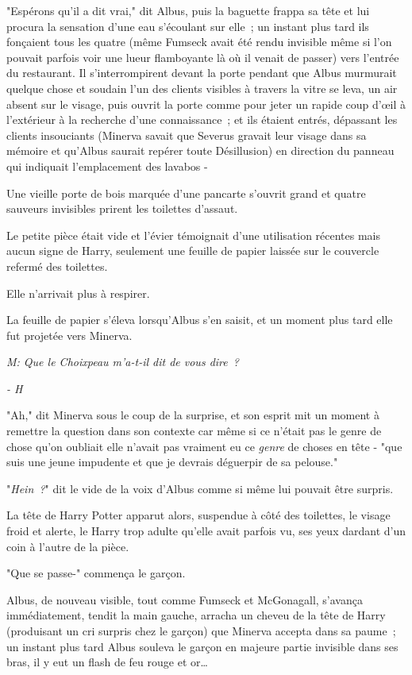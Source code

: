 "Espérons qu'il a dit vrai," dit Albus, puis la baguette frappa sa tête et lui procura la sensation d'une eau s'écoulant sur elle~; un instant plus tard ils fonçaient tous les quatre (même Fumseck avait été rendu invisible même si l'on pouvait parfois voir une lueur flamboyante là où il venait de passer) vers l'entrée du restaurant. Il s'interrompirent devant la porte pendant que Albus murmurait quelque chose et soudain l'un des clients visibles à travers la vitre se leva, un air absent sur le visage, puis ouvrit la porte comme pour jeter un rapide coup d'œil à l'extérieur à la recherche d'une connaissance~; et ils étaient entrés, dépassant les clients insouciants (Minerva savait que Severus gravait leur visage dans sa mémoire et qu'Albus saurait repérer toute Désillusion) en direction du panneau qui indiquait l'emplacement des lavabos -

Une vieille porte de bois marquée d'une pancarte s'ouvrit grand et quatre sauveurs invisibles prirent les toilettes d'assaut.

Le petite pièce était vide et l'évier témoignait d'une utilisation récentes mais aucun signe de Harry, seulement une feuille de papier laissée sur le couvercle refermé des toilettes.

Elle n'arrivait plus à respirer.

La feuille de papier s'éleva lorsqu'Albus s'en saisit, et un moment plus tard elle fut projetée vers Minerva.

\emph{M: Que le Choixpeau m'a-t-il dit de vous dire~?}

\emph{- H}

"Ah," dit Minerva sous le coup de la surprise, et son esprit mit un moment à remettre la question dans son contexte car même si ce n'était pas le genre de chose qu'on oubliait elle n'avait pas vraiment eu ce \emph{genre} de choses en tête - "que suis une jeune impudente et que je devrais déguerpir de sa pelouse."

"\emph{Hein~?}" dit le vide de la voix d'Albus comme si même lui pouvait être surpris.

La tête de Harry Potter apparut alors, suspendue à côté des toilettes, le visage froid et alerte, le Harry trop adulte qu'elle avait parfois vu, ses yeux dardant d'un coin à l'autre de la pièce.

"Que se passe-" commença le garçon.

Albus, de nouveau visible, tout comme Fumseck et McGonagall, s'avança immédiatement, tendit la main gauche, arracha un cheveu de la tête de Harry (produisant un cri surpris chez le garçon) que Minerva accepta dans sa paume~; un instant plus tard Albus souleva le garçon en majeure partie invisible dans ses bras, il y eut un flash de feu rouge et or…

